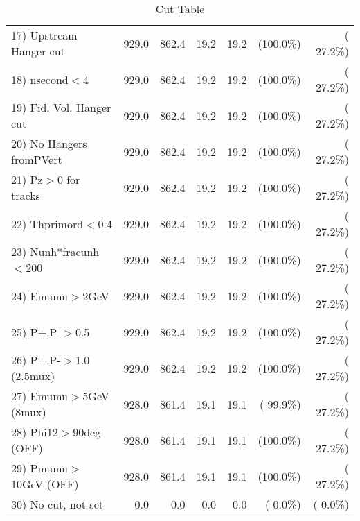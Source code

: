 \begin{table}[h!]
\begin{tabular}{||l||r|r|r|r|r|r||}
 17) Upstream Hanger cut  &        929.0 &        862.4 &         19.2 &         19.2 & (100.0\%) & ( 27.2\%) \\
 18) nsecond$<$4          &        929.0 &        862.4 &         19.2 &         19.2 & (100.0\%) & ( 27.2\%) \\
 19) Fid. Vol. Hanger cut &        929.0 &        862.4 &         19.2 &         19.2 & (100.0\%) & ( 27.2\%) \\
 20) No Hangers fromPVert &        929.0 &        862.4 &         19.2 &         19.2 & (100.0\%) & ( 27.2\%) \\
 21) Pz$>$0 for tracks    &        929.0 &        862.4 &         19.2 &         19.2 & (100.0\%) & ( 27.2\%) \\
 22) Thprimord$<$0.4      &        929.0 &        862.4 &         19.2 &         19.2 & (100.0\%) & ( 27.2\%) \\
 23) Nunh*fracunh$<$200   &        929.0 &        862.4 &         19.2 &         19.2 & (100.0\%) & ( 27.2\%) \\
 24) Emumu$>$2GeV         &        929.0 &        862.4 &         19.2 &         19.2 & (100.0\%) & ( 27.2\%) \\
 25) P+,P-$>$0.5          &        929.0 &        862.4 &         19.2 &         19.2 & (100.0\%) & ( 27.2\%) \\
 26) P+,P-$>$1.0 (2.5mux) &        929.0 &        862.4 &         19.2 &         19.2 & (100.0\%) & ( 27.2\%) \\
 27) Emumu$>$5GeV  (8mux) &        928.0 &        861.4 &         19.1 &         19.1 & ( 99.9\%) & ( 27.2\%) \\
 28) Phi12$>$90deg  (OFF) &        928.0 &        861.4 &         19.1 &         19.1 & (100.0\%) & ( 27.2\%) \\
 29) Pmumu$>$10GeV  (OFF) &        928.0 &        861.4 &         19.1 &         19.1 & (100.0\%) & ( 27.2\%) \\
 30) No cut, not set      &          0.0 &          0.0 &          0.0 &          0.0 & (  0.0\%) & (  0.0\%) \\
 \hline
 \hline
 \end{tabular}
 \caption{Cut Table           }
 \label{tab-cutheavy_neutrino_4.000}
 \end{table}

